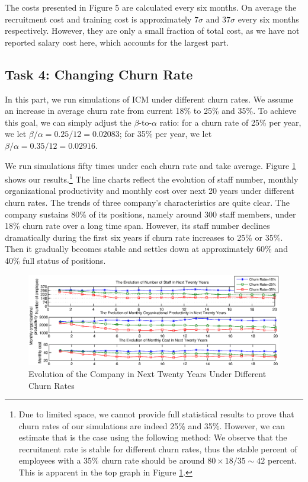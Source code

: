 \documentclass[tcn = 37075, sheet = false, abstract = false]{mcmthesis}
\begin{document}
The costs presented in Figure 5 are calculated every six months. On average the recruitment cost and training cost is approximately $7\sigma$ and $37\sigma$ every six months respectively. However, they are only a small fraction of total cost, as we have not reported salary cost here, which accounts for the largest part.

\subsection{Task 4: Changing Churn Rate}

In this part, we run simulations of ICM under different churn rates. We assume an increase in average churn rate from current 18\% to 25\% and 35\%. To achieve this goal, we can simply adjust the $\beta$-to-$\alpha$ ratio: for a churn rate of 25\% per year, we let $\beta/\alpha = 0.25/12 = 0.02083$; for 35\% per year, we let $\beta/\alpha = 0.35/12 = 0.02916$.

We run simulations fifty times under each churn rate and take average.  Figure \ref{fig:churn} shows our results.\footnote{Due to limited space, we cannot provide full statistical results to prove that churn rates of our simulations are indeed 25\% and 35\%. However, we can estimate that is the case using the following method: We observe that the recruitment rate is stable for different churn rates, thus the stable percent of employees with a 35\% churn rate should be around $80 \times 18 / 35 \sim 42$ percent. This is apparent in the top graph in Figure \ref{fig:churn}.} The line charts reflect the evolution of staff number, monthly organizational productivity and monthly cost over next 20 years under different churn rates. The trends of three company's characteristics are quite clear. The company sustains 80\% of its positions, namely around 300 staff members, under 18\% churn rate over a long time span. However, its staff number declines dramatically during the first six years if churn rate increases to 25\% or 35\%. Then it gradually becomes stable and settles down at approximately 60\% and 40\% full status of positions.


\begin{figure}[htb!]
\centering
\includegraphics[width=16cm]{Task4_1.eps}
\caption{Evolution of the Company in Next Twenty Years Under Different Churn Rates} 
\label{fig:churn}
\end{figure}
\end{document}
